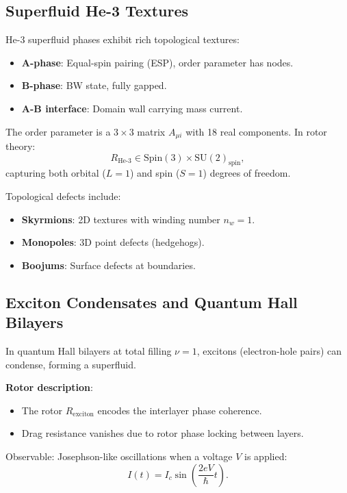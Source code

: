 \documentclass[12pt,a4paper]{article}
\theoremstyle{definition}
\theoremstyle{remark}
\begin{document}
\subsection{Superfluid He-3 Textures}

He-3 superfluid phases exhibit rich topological textures:
\begin{itemize}
\item \textbf{A-phase}: Equal-spin pairing (ESP), order parameter has nodes.
\item \textbf{B-phase}: BW state, fully gapped.
\item \textbf{A-B interface}: Domain wall carrying mass current.
\end{itemize}

The order parameter is a $3 \times 3$ matrix $A_{\mu i}$ with 18 real components. In rotor theory:
\begin{equation}
R_{\text{He-3}} \in \mathrm{Spin}(3) \times \mathrm{SU}(2)_{\text{spin}},
\end{equation}
capturing both orbital ($L=1$) and spin ($S=1$) degrees of freedom.

Topological defects include:
\begin{itemize}
\item \textbf{Skyrmions}: 2D textures with winding number $n_w = 1$.
\item \textbf{Monopoles}: 3D point defects (hedgehogs).
\item \textbf{Boojums}: Surface defects at boundaries.
\end{itemize}

\subsection{Exciton Condensates and Quantum Hall Bilayers}

In quantum Hall bilayers at total filling $\nu = 1$, excitons (electron-hole pairs) can condense, forming a superfluid.

\textbf{Rotor description}:
\begin{itemize}
\item The rotor $R_{\text{exciton}}$ encodes the interlayer phase coherence.
\item Drag resistance vanishes due to rotor phase locking between layers.
\end{itemize}

Observable: Josephson-like oscillations when a voltage $V$ is applied:
\begin{equation}
I(t) = I_c \sin\left(\frac{2eV}{\hbar} t\right).
\end{equation}
\end{document}
